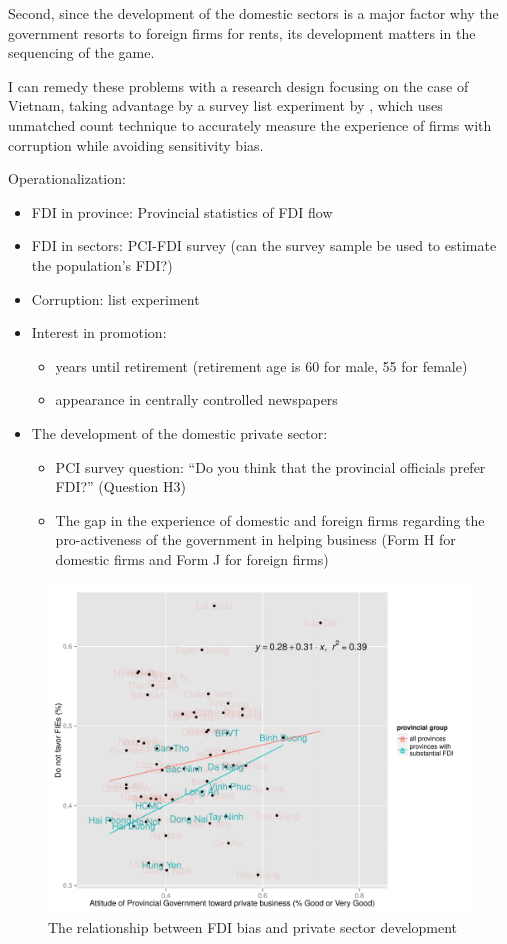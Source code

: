 Second, since the development of the domestic sectors is a major factor why the government resorts to foreign firms for rents, its development matters in the sequencing of the game.

I can remedy these problems with a research design focusing on the case of Vietnam, taking advantage by a survey list experiment by \citet{Malesky2015}, which uses unmatched count technique to accurately measure the experience of firms with corruption while avoiding sensitivity bias.

Operationalization:
\begin{itemize}
\item FDI in province: Provincial statistics of FDI flow
\item FDI in sectors: PCI-FDI survey (can the survey sample be used to estimate the population's FDI?)
\item Corruption: list experiment \citep{Malesky2015}
\item Interest in promotion: 
\begin{itemize}
	\item years until retirement (retirement age is 60 for male, 55 for female)
	\item appearance in centrally controlled newspapers
\end{itemize}
\item The development of the domestic private sector:
\begin{itemize}
	\item PCI survey question: ``Do you think that the provincial officials prefer FDI?'' (Question H3)
	\item The gap in the experience of domestic and foreign firms regarding the pro-activeness of the government in helping business (Form H for domestic firms and Form J for foreign firms)
\end{itemize}
\end{itemize}

\begin{figure}[!ht]
\includegraphics[width=\textwidth, height=\textheight,keepaspectratio]{../figure/FDI_bias}
\caption{The relationship between FDI bias and private sector development}
\label{fig:globalfdi}
\end{figure}


